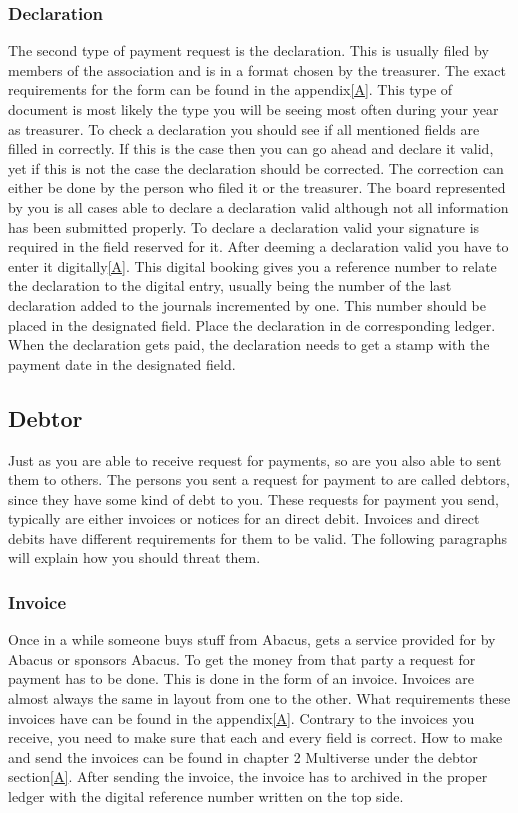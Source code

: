 \documentclass{report}
\begin{document}
\subsubsection{Declaration}
The second type of payment request is the declaration. This is usually filed by members of the association and is in a format chosen by the treasurer. The exact requirements for the form can be found in the appendix\ref{A}. This type of document is most likely the type you will be seeing most often during your year as treasurer. To check a declaration you should see if all mentioned fields are filled in correctly. If this is the case then you can go ahead and declare it valid, yet if this is not the case the declaration should be corrected. The correction can either be done by the person who filed it or the treasurer. The board represented by you is all cases able to declare a declaration valid although not all information has been submitted properly. To declare a declaration valid your signature is required in the field reserved for it. After deeming a declaration valid you have to enter it digitally\ref{A}. This digital booking gives you a reference number to relate the declaration to the digital entry, usually being the number of the last declaration added to the journals incremented by one. This number should be placed in the designated field. Place the declaration in de corresponding ledger. When the declaration gets paid, the declaration needs to get a stamp with the payment date in the designated field.        

\subsection{Debtor}
Just as you are able to receive request for payments, so are you also able to sent them to others. The persons you sent a request for payment to are called debtors, since they have some kind of debt to you. These requests for payment you send, typically are either invoices or notices for an direct debit. Invoices and direct debits have different requirements for them to be valid. The following paragraphs will explain how you should threat them. 

\subsubsection{Invoice}
Once in a while someone buys stuff from Abacus, gets a service provided for by Abacus or sponsors Abacus. To get the money from that party a request for payment has to be done. This is done in the form of an invoice. Invoices are almost always the same in layout from one to the other. What requirements these invoices have can be found in the appendix\ref{A}. Contrary to the invoices you receive, you need to make sure that each and every field is correct. How to make and send the invoices can be found in chapter 2 Multiverse under the debtor section\ref{A}. After sending the invoice, the invoice has to archived in the proper ledger with the digital reference number written on the top side.    
\end{document}
